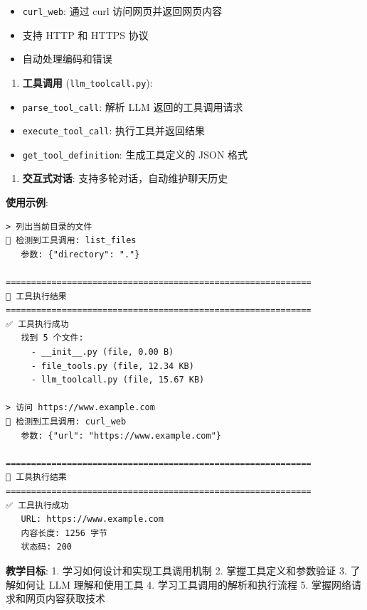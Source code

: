 \documentclass[]{article}
\providecommand{\tightlist}{%
  \setlength{\itemsep}{0pt}\setlength{\parskip}{0pt}}
\begin{document}
\begin{itemize}
\tightlist
\item
  \texttt{curl\_web}: 通过 curl 访问网页并返回网页内容
\item
  支持 HTTP 和 HTTPS 协议
\item
  自动处理编码和错误
\end{itemize}

\begin{enumerate}
\def\labelenumi{\arabic{enumi}.}
\setcounter{enumi}{2}
\tightlist
\item
  \textbf{工具调用} (\texttt{llm\_toolcall.py}):
\end{enumerate}

\begin{itemize}
\tightlist
\item
  \texttt{parse\_tool\_call}: 解析 LLM 返回的工具调用请求
\item
  \texttt{execute\_tool\_call}: 执行工具并返回结果
\item
  \texttt{get\_tool\_definition}: 生成工具定义的 JSON 格式
\end{itemize}

\begin{enumerate}
\def\labelenumi{\arabic{enumi}.}
\setcounter{enumi}{3}
\tightlist
\item
  \textbf{交互式对话}: 支持多轮对话，自动维护聊天历史
\end{enumerate}

\textbf{使用示例}:

\begin{verbatim}
> 列出当前目录的文件
🔧 检测到工具调用: list_files
   参数: {"directory": "."}

============================================================
🔧 工具执行结果
============================================================
✅ 工具执行成功
   找到 5 个文件:
     - __init__.py (file, 0.00 B)
     - file_tools.py (file, 12.34 KB)
     - llm_toolcall.py (file, 15.67 KB)

> 访问 https://www.example.com
🔧 检测到工具调用: curl_web
   参数: {"url": "https://www.example.com"}

============================================================
🔧 工具执行结果
============================================================
✅ 工具执行成功
   URL: https://www.example.com
   内容长度: 1256 字节
   状态码: 200
\end{verbatim}

\textbf{教学目标}: 1. 学习如何设计和实现工具调用机制 2.
掌握工具定义和参数验证 3. 了解如何让 LLM 理解和使用工具 4.
学习工具调用的解析和执行流程 5. 掌握网络请求和网页内容获取技术
\end{document}

